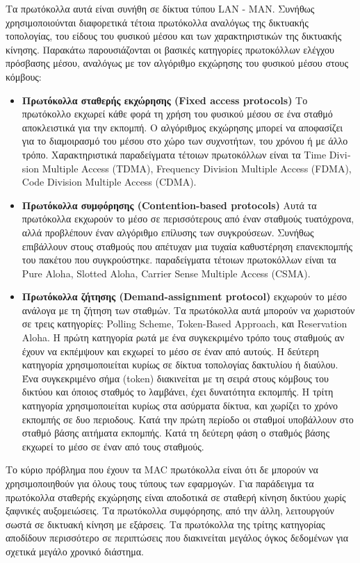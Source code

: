 \documentclass[12pt]{report}
\begin{document}
Τα πρωτόκολλα αυτά είναι συνήθη σε δίκτυα τύπου \textlatin{LAN - MAN}. Συνήθως χρησιμοποιούνται διαφορετικά τέτοια πρωτόκολλα αναλόγως της δικτυακής τοπολογίας, του είδους του φυσικού μέσου και των χαρακτηριστικών της δικτυακής κίνησης. Παρακάτω παρουσιάζονται οι βασικές κατηγορίες πρωτοκόλλων ελέγχου πρόσβασης μέσου, αναλόγως με τον αλγόριθμο εκχώρησης του φυσικού μέσου στους κόμβους:
\begin{itemize}
  \item \textbf{Πρωτόκολλα σταθερής εκχώρησης (\textlatin{Fixed access protocols})} Το πρωτόκολλο εκχωρεί κάθε φορά τη χρήση του φυσικού μέσου σε ένα σταθμό αποκλειστικά για την εκπομπή. Ο αλγόριθμος εκχώρησης μπορεί να αποφασίζει για το διαμοιρασμό του μέσου στο χώρο των συχνοτήτων, του χρόνου ή με άλλο τρόπο. Χαρακτηριστικά παραδείγματα τέτοιων πρωτοκόλλων είναι τα \textlatin{Time Division Multiple Access (TDMA), Frequency Division Multiple Access (FDMA), Code Division Multiple Access (CDMA)}.
  \item \textbf{Πρωτόκολλα συμφόρησης (\textlatin{Contention-based protocols})} Αυτά τα πρωτόκολλα εκχωρούν το μέσο σε περισσότερους από έναν σταθμούς τυατόχρονα, αλλά προβλέπουν έναν αλγόριθμο επίλυσης των συγκρούσεων. Συνήθως επιβάλλουν στους σταθμούς που απέτυχαν μια τυχαία καθυστέρηση επανεκπομπής του πακέτου που συγκρούστηκε. παραδείγματα τέτοιων πρωτοκόλλων είναι τα \textlatin{Pure Aloha, Slotted Aloha, Carrier Sense Multiple Access (CSMA)}.
  \item \textbf{Πρωτόκολλα ζήτησης (\textlatin{Demand-assignment protocol})} εκχωρούν το μέσο ανάλογα με τη ζήτηση των σταθμών. Τα πρωτόκολλα αυτά μπορούν να χωριστούν σε τρεις κατηγορίες: \textlatin{Polling Scheme, Token-Based Approach}, και \textlatin{Reservation Aloha}. Η πρώτη κατηγορία ρωτά με ένα συγκεκριμένο τρόπο τους σταθμούς αν έχουν να εκπέμψουν και εκχωρεί το μέσο σε έναν από αυτούς. Η δεύτερη κατηγορία χρησιμοποιείται κυρίως σε δίκτυα τοπολογίας δακτυλίου ή διαύλου. Ένα συγκεκριμένο σήμα (\textlatin{token}) διακινείται με τη σειρά στους κόμβους του δικτύου και όποιος σταθμός το λαμβάνει, έχει δυνατότητα εκπομπής. Η τρίτη κατηγορία χρησιμοποιείται κυρίως στα ασύρματα δίκτυα, και χωρίζει το χρόνο εκπομπής σε δυο περιοδους. Κατά την πρώτη περίοδο οι σταθμοί υποβάλλουν στο σταθμό βάσης αιτήματα εκπομπής. Κατά τη δεύτερη φάση ο σταθμός βάσης εκχωρεί το μέσο σε έναν από τους σταθμούς.
\end{itemize}

Το κύριο πρόβλημα που έχουν τα \textlatin{MAC} πρωτόκολλα είναι ότι δε μπορούν να χρησιμοποιηθούν για όλους τους τύπους των εφαρμογών. Για παράδειγμα τα πρωτόκολλα σταθερής εκχώρησης είναι αποδοτικά σε σταθερή κίνηση δικτύου χωρίς ξαφνικές αυξομειώσεις. Τα πρωτόκολλα συμφόρησης, από την άλλη, λειτουργούν σωστά σε δικτυακή κίνηση με εξάρσεις. Τα πρωτόκολλα της τρίτης κατηγορίας αποδίδουν περισσότερο σε περιπτώσεις που διακινείται μεγάλος όγκος δεδομένων για σχετικά μεγάλο χρονικό διάστημα.
\end{document}
